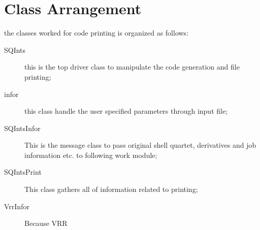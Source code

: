 \section{Class Arrangement}

the classes worked for code printing is organized as follows:
\begin{description}
 \item [SQInts]  this is the top driver class to manipulate the code generation and 
 file printing;
 \item [infor]   this class handle the user specified parameters through input file;
 \item [SQIntsInfor]  This is the message class to pass original shell quartet, derivatives 
 and job information etc. to following work module;
 \item [SQIntsPrint]  This class gathers all of information related to printing;
 \item [VrrInfor] Because VRR 
\end{description}
